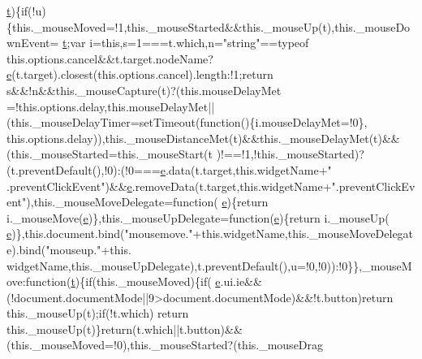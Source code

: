 \begin{DoxyCode}
      \hyperlink{jquery-2_80_83_8min_8js_aaccc9105df5383111407fd5b41255e23}{t})\{\textcolor{keywordflow}{if}(!u)\{this.\_mouseMoved=!1,this.\_mouseStarted&&this.\_mouseUp(t),this.\_mouseDownEvent=
      \hyperlink{jquery-2_80_83_8min_8js_aaccc9105df5383111407fd5b41255e23}{t};var i=\textcolor{keyword}{this},s=1===t.which,n=\textcolor{stringliteral}{"string"}==typeof this.options.cancel&&t.target.nodeName?
      \hyperlink{jquery-ui_8min_8js_a2c038346d47955cbe2cb91e338edd7e1}{e}(t.target).closest(this.options.cancel).length:!1;\textcolor{keywordflow}{return} s&&!n&&this.\_mouseCapture(t)?(this.mouseDelayMet
      =!this.options.delay,this.mouseDelayMet||(this.\_mouseDelayTimer=setTimeout(\textcolor{keyword}{function}()\{i.mouseDelayMet=!0\},
      this.options.delay)),this.\_mouseDistanceMet(t)&&this.\_mouseDelayMet(t)&&(this.\_mouseStarted=this.\_mouseStart(t
      )!==!1,!this.\_mouseStarted)?(t.preventDefault(),!0):(!0===\hyperlink{jquery-ui_8min_8js_a2c038346d47955cbe2cb91e338edd7e1}{e}.data(t.target,\textcolor{keyword}{this}.widgetName+\textcolor{stringliteral}{"
      .preventClickEvent"})&&\hyperlink{jquery-ui_8min_8js_a2c038346d47955cbe2cb91e338edd7e1}{e}.removeData(t.target,\textcolor{keyword}{this}.widgetName+\textcolor{stringliteral}{".preventClickEvent"}),this.\_mouseMoveDelegate=\textcolor{keyword}{function}(
      \hyperlink{jquery-ui_8min_8js_a2c038346d47955cbe2cb91e338edd7e1}{e})\{\textcolor{keywordflow}{return} i.\_mouseMove(\hyperlink{jquery-ui_8min_8js_a2c038346d47955cbe2cb91e338edd7e1}{e})\},this.\_mouseUpDelegate=\textcolor{keyword}{function}(\hyperlink{jquery-ui_8min_8js_a2c038346d47955cbe2cb91e338edd7e1}{e})\{\textcolor{keywordflow}{return} i.\_mouseUp(
      \hyperlink{jquery-ui_8min_8js_a2c038346d47955cbe2cb91e338edd7e1}{e})\},this.document.bind(\textcolor{stringliteral}{"mousemove."}+this.widgetName,this.\_mouseMoveDelegate).bind(\textcolor{stringliteral}{"mouseup."}+this.
      widgetName,this.\_mouseUpDelegate),t.preventDefault(),u=!0,!0)):!0\}\},\_mouseMove:\textcolor{keyword}{function}(\hyperlink{jquery-2_80_83_8min_8js_aaccc9105df5383111407fd5b41255e23}{t})\{\textcolor{keywordflow}{if}(this.\_mouseMoved)\{\textcolor{keywordflow}{if}(
      \hyperlink{jquery-ui_8min_8js_a2c038346d47955cbe2cb91e338edd7e1}{e}.ui.ie&&(!document.documentMode||9>document.documentMode)&&!t.button)\textcolor{keywordflow}{return} this.\_mouseUp(t);\textcolor{keywordflow}{if}(!t.which)\textcolor{keywordflow}{
      return} this.\_mouseUp(t)\}\textcolor{keywordflow}{return}(t.which||t.button)&&(this.\_mouseMoved=!0),this.\_mouseStarted?(this.\_mouseDrag

\end{DoxyCode}

